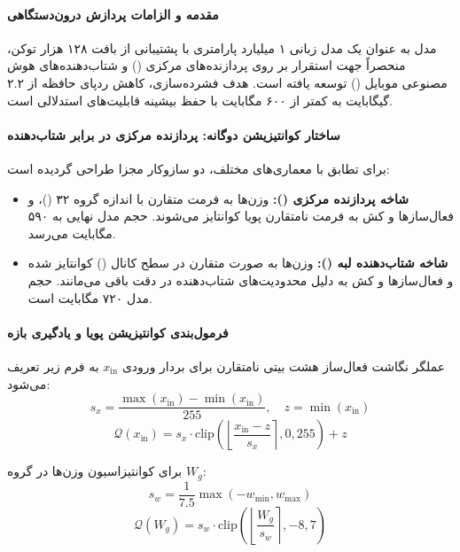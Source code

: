 \item {}

\paragraph*{مقدمه و الزامات پردازش درون‌دستگاهی}
مدل  \cite{huber2025mobilellmpro} به عنوان یک مدل زبانی ۱ میلیارد پارامتری با پشتیبانی از بافت ۱۲۸ هزار توکن، منحصراً جهت استقرار بر روی پردازنده‌های مرکزی () و شتاب‌دهنده‌های هوش مصنوعی موبایل () توسعه یافته است. هدف فشرده‌سازی، کاهش ردپای حافظه از ۲.۲ گیگابایت به کمتر از ۶۰۰ مگابایت با حفظ بیشینه قابلیت‌های استدلالی است.

\paragraph*{ساختار کوانتیزیشن دوگانه: پردازنده مرکزی در برابر شتاب‌دهنده}
برای تطابق با معماری‌های مختلف، دو سازوکار مجزا طراحی گردیده است:
\begin{itemize}
    \item \textbf{شاخه پردازنده مرکزی ():} وزن‌ها به فرمت متقارن  با اندازه گروه ۳۲ ()، و فعال‌سازها و کش  به فرمت نامتقارن پویا  کوانتایز می‌شوند. حجم مدل نهایی به ۵۹۰ مگابایت می‌رسد.
    \item \textbf{شاخه شتاب‌دهنده لبه ():} وزن‌ها به صورت متقارن در سطح کانال () کوانتایز شده و فعال‌سازها و کش  به دلیل محدودیت‌های شتاب‌دهنده در دقت  باقی می‌مانند. حجم مدل ۷۲۰ مگابایت است.
\end{itemize}

\paragraph*{فرمول‌بندی کوانتیزیشن پویا و یادگیری بازه}
عملگر نگاشت فعال‌ساز هشت بیتی نامتقارن برای بردار ورودی $x_{\text{in}}$ به فرم زیر تعریف می‌شود:
\begin{equation}
    s_x = \frac{\max(x_{\text{in}}) - \min(x_{\text{in}})}{255}, \quad z = \min(x_{\text{in}})
\end{equation}
\begin{equation}
    \mathcal{Q}(x_{\text{in}}) = s_x \cdot \text{clip}\left( \left\lfloor \frac{x_{\text{in}} - z}{s_x} \right\rceil, 0, 255 \right) + z
\end{equation}

برای کوانتیزاسیون وزن‌ها در گروه $W_g$:
\begin{equation}
    s_w = \frac{1}{7.5} \max(-w_{\min}, w_{\max})
\end{equation}
\begin{equation}
    \mathcal{Q}(W_g) = s_w \cdot \text{clip}\left( \left\lfloor \frac{W_g}{s_w} \right\rceil, -8, 7 \right)
\end{equation}

